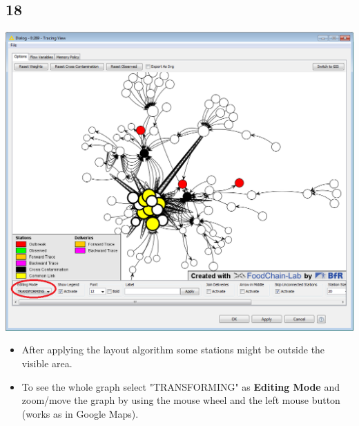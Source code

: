 \documentclass{beamer}
\begin{document}
\subsection{18}
\begin{frame}
	\begin{center}
  		\includegraphics[height=0.6\textheight]{18.png}
	\end{center}
	\begin{itemize}
		\item After applying the layout algorithm some stations might be outside the visible area.
		\item To see the whole graph select "TRANSFORMING" as \textbf{Editing Mode} and zoom/move the graph by using the mouse wheel and the left mouse button (works as in Google Maps).
	\end{itemize}
\end{frame}
\end{document}
